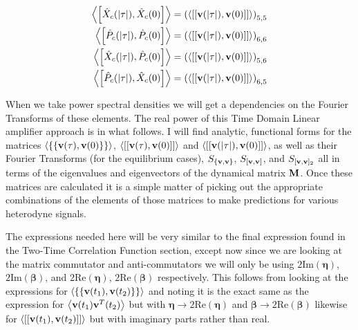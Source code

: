 \documentclass[12pt]{article}
\newcommand{\bv}[1]{\bold{#1}}
\newcommand{\bs}[1]{\boldsymbol{#1}}
\begin{document}
\begin{align}
\Braket{\left[\hat{X}_c(\lvert \tau \rvert),\hat{X}_c(0)\right]} &= \left(\Braket{\left[\left[\bv{v}(\lvert \tau \rvert),\bv{v}(0)\right]\right]}\right)_{5,5}\\
\Braket{\left[\hat{P}_c(\lvert \tau \rvert),\hat{P}_c(0)\right]} &= \left(\Braket{\left[\left[\bv{v}(\lvert \tau \rvert),\bv{v}(0)\right]\right]}\right)_{6,6}\\
\Braket{\left[\hat{X}_c(\lvert \tau \rvert),\hat{P}_c(0)\right]} &= \left(\Braket{\left[\left[\bv{v}(\lvert \tau \rvert),\bv{v}(0)\right]\right]}\right)_{5,6}\\
\Braket{\left[\hat{P}_c(\lvert \tau \rvert),\hat{X}_c(0)\right]} &= \left(\Braket{\left[\left[\bv{v}(\lvert \tau \rvert),\bv{v}(0)\right]\right]}\right)_{6,5}\\
\end{align}

When we take power spectral densities we will get a dependencies on the Fourier Transforms of these elements. The real power of this Time Domain Linear amplifier approach is in what follows. I will find analytic, functional forms for the matrices $\Braket{\left\{\left\{\bv{v}(\tau),\bv{v}(0)\right\}\right\}}$, $\Braket{\left[\left[\bv{v}(\tau),\bv{v}(0)\right]\right]}$ and $\Braket{\left[\left[\bv{v}(\lvert \tau \rvert),\bv{v}(0)\right]\right]}$, as well as their Fourier Transforms (for the equilibrium cases), $S_{\{\bv{v},\bv{v}\}}$, $S_{[\bv{v},\bv{v}]}$, and $S_{[\bv{v},\bv{v}]_2}$ all in terms of the eigenvalues and eigenvectors of the dynamical matrix $\bv{M}$. Once these matrices are calculated it is a simple matter of picking out the appropriate combinations of the elements of those matrices to make predictions for various heterodyne signals.

The expressions needed here will be very similar to the final expression found in the Two-Time Correlation Function section, except now since we are looking at the matrix commutator and anti-commutators we will only be using $2\text{Im}\left(\bs{\eta}\right)$, $2\text{Im}\left(\bs{\beta}\right)$, and $2\text{Re}\left(\bs{\eta}\right)$, $2\text{Re}\left(\bs{\beta}\right)$ respectively. This follows from looking at the expressions for $\Braket{\left\{\left\{\bv{v}(t_1),\bv{v}(t_2)\right\}\right\}}$ and noting it is the exact same as the expression for $\Braket{\bv{v}(t_1)\bv{v}^T(t_2)}$ but with $\bs{\eta}\rightarrow 2\text{Re}\left(\bs{\eta}\right)$ and $\bs{\beta}\rightarrow 2\text{Re}\left(\bs{\beta}\right)$ likewise for $\Braket{\left[\left[\bv{v}(t_1),\bv{v}(t_2)\right]\right]}$ but with imaginary parts rather than real.
\end{document}
